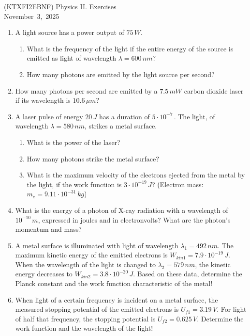 \documentclass[a4paper,12pt]{letter}
\begin{document}
\begin{center}
 (KTXFI2EBNF) Physics II.  Exercises\\ \smallskip
November~3,~2025
 \end{center}

\begin{enumerate}

\item A light source has a power output of $75\,W$.

\begin{enumerate}
    \item[a)] What is the frequency of the light if the entire energy of the source is emitted as light of wavelength $ \lambda = 600\,nm $?
    \item[b)] How many photons are emitted by the light source per second?
\end{enumerate}

\item How many photons per second are emitted by a $ 7.5\,mW $ carbon dioxide laser if its wavelength is $ 10.6\,\mu m$?

\item A laser pulse of energy $ 20 \,J$ has a duration of $ 5 \cdot 10^{-7} \,$.  The light, of wavelength $ \lambda = 580\,nm $, strikes a metal surface.

\begin{enumerate}
    \item What is the power of the laser?
    \item How many photons strike the metal surface?
    \item What is the maximum velocity of the electrons ejected from the metal by the light, if the work function is $ 3 \cdot 10^{-19} \,J$?     (Electron mass: $ m_{e} = 9.11 \cdot 10^{-31} \,kg$)
\end{enumerate}

\item What is the energy of a photon of X-ray radiation with a wavelength of $ 10^{-10}\,m$, expressed in joules and in electronvolts?  What are the photon's momentum and mass?

\item A metal surface is illuminated with light of wavelength $ \lambda_{1} = 492\,nm $.  The maximum kinetic energy of the emitted electrons is $ W_{kin1} = 7.9 \cdot 10^{-19} \,J$.  When the wavelength of the light is changed to $ \lambda_{2} = 579\,nm $, the kinetic energy decreases to $ W_{kin2} =3.8 \cdot 10^{-20} \,J$.  Based on these data, determine the Planck constant and the work function characteristic of the metal!

\item When light of a certain frequency is incident on a metal surface, the measured stopping potential of the emitted electrons is $ U_{f1} = 3.19\,V$.  For light of half that frequency, the stopping potential is $ U_{f2} = 0.625 \,V $.   Determine the work function and the wavelength of the light!
\end{enumerate}

  
\bigskip


\vfill
\end{document}
